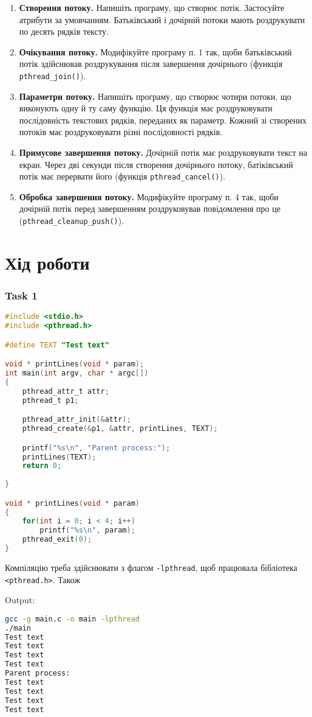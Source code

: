 \documentclass{article}
\begin{document}
 
\large
\begin{enumerate}
	\item \textbf{Створення потоку.} Напишіть програму, що створює потік. Застосуйте
	атрибути за умовчанням. Батьківський і дочірній потоки мають
	роздрукувати по десять рядків тексту.
	\item \textbf{Очікування потоку.} Модифікуйте програму п. 1 так, щоби
	батьківський потік здійснював роздрукування після завершення
	дочірнього (функція \texttt{pthread\_join()}).
	\item \textbf{Параметри потоку.} Напишіть програму, що створює чотири потоки,
	що виконують одну й ту саму функцію. Ця функція має роздруковувати
	послідовність текстових рядків, переданих як параметр. Кожний
	зі створених потоків має роздруковувати різні послідовності рядків.
	\item \textbf{Примусове завершення потоку.} Дочірній потік має роздруковувати
	текст на екран. Через дві секунди після створення дочірнього потоку,
	батіківський потік має перервати його (функція \texttt{pthread\_cancel()}).
	\item \textbf{Обробка завершення потоку.} Модифікуйте програму п. 4 так, щоби
	дочірній потік перед завершенням роздруковував повідомлення про це
	(\texttt{pthread\_cleanup\_push()}).
\end{enumerate}
\newpage
\part*{Хід роботи}
\section*{Task 1}
\begin{lstlisting}[language=C]
#include <stdio.h>
#include <pthread.h>

#define TEXT "Test text"

void * printLines(void * param);
int main(int argv, char * argc[])
{
	pthread_attr_t attr;
	pthread_t p1;

	pthread_attr_init(&attr);
	pthread_create(&p1, &attr, printLines, TEXT);

	printf("%s\n", "Parent process:");
	printLines(TEXT);
	return 0;
	
}

void * printLines(void * param)
{
	for(int i = 0; i < 4; i++)
		printf("%s\n", param);
	pthread_exit(0);
}
\end{lstlisting}
Компіляцію треба здійснювати з флагом \texttt{-lpthread}, щоб працювала бібліотека \linebreak\texttt{<pthread.h>}. Також

Output:
\begin{lstlisting}[language=BASH]
gcc -g main.c -o main -lpthread
./main 
Test text
Test text
Test text
Test text
Parent process:
Test text
Test text
Test text
Test text
\end{lstlisting}


\begin{lstlisting}[language=BASH]
\end{lstlisting}
\end{document}
